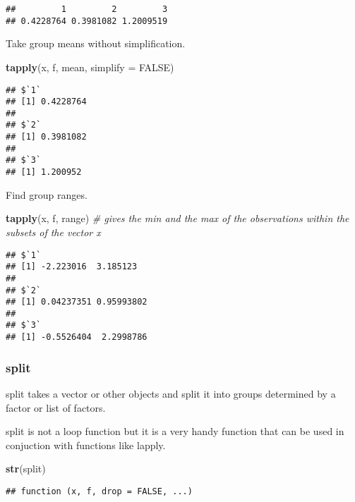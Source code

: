 \documentclass[
]{article}
\newenvironment{Shaded}{\begin{snugshade}}{\end{snugshade}}
\newcommand{\CommentTok}[1]{\textcolor[rgb]{0.56,0.35,0.01}{\textit{#1}}}
\newcommand{\DataTypeTok}[1]{\textcolor[rgb]{0.13,0.29,0.53}{#1}}
\newcommand{\KeywordTok}[1]{\textcolor[rgb]{0.13,0.29,0.53}{\textbf{#1}}}
\newcommand{\NormalTok}[1]{#1}
\newcommand{\OtherTok}[1]{\textcolor[rgb]{0.56,0.35,0.01}{#1}}
\begin{document}
\begin{verbatim}
##         1         2         3 
## 0.4228764 0.3981082 1.2009519
\end{verbatim}

Take group means without simplification.

\begin{Shaded}
\begin{Highlighting}[]
\KeywordTok{tapply}\NormalTok{(x, f, mean, }\DataTypeTok{simplify =} \OtherTok{FALSE}\NormalTok{)}
\end{Highlighting}
\end{Shaded}

\begin{verbatim}
## $`1`
## [1] 0.4228764
## 
## $`2`
## [1] 0.3981082
## 
## $`3`
## [1] 1.200952
\end{verbatim}

Find group ranges.

\begin{Shaded}
\begin{Highlighting}[]
\KeywordTok{tapply}\NormalTok{(x, f, range) }\CommentTok{\# gives the min and the max of the observations within the subsets of the vector x}
\end{Highlighting}
\end{Shaded}

\begin{verbatim}
## $`1`
## [1] -2.223016  3.185123
## 
## $`2`
## [1] 0.04237351 0.95993802
## 
## $`3`
## [1] -0.5526404  2.2998786
\end{verbatim}

\hypertarget{split}{%
\subsubsection{split}\label{split}}

split takes a vector or other objects and split it into groups
determined by a factor or list of factors.

split is not a loop function but it is a very handy function that can be
used in conjuction with functions like lapply.

\begin{Shaded}
\begin{Highlighting}[]
\KeywordTok{str}\NormalTok{(split)}
\end{Highlighting}
\end{Shaded}

\begin{verbatim}
## function (x, f, drop = FALSE, ...)
\end{verbatim}
\end{document}
